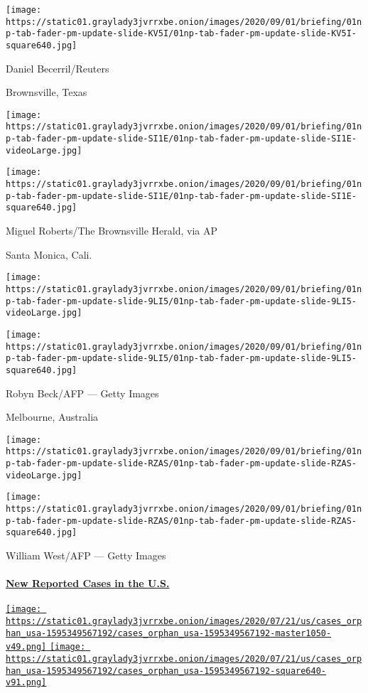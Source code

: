 \texttt{[image: https://static01.graylady3jvrrxbe.onion/images/2020/09/01/briefing/01np-tab-fader-pm-update-slide-KV5I/01np-tab-fader-pm-update-slide-KV5I-square640.jpg]}

 Daniel Becerril/Reuters

Brownsville, Texas

\texttt{[image: https://static01.graylady3jvrrxbe.onion/images/2020/09/01/briefing/01np-tab-fader-pm-update-slide-SI1E/01np-tab-fader-pm-update-slide-SI1E-videoLarge.jpg]}

\texttt{[image: https://static01.graylady3jvrrxbe.onion/images/2020/09/01/briefing/01np-tab-fader-pm-update-slide-SI1E/01np-tab-fader-pm-update-slide-SI1E-square640.jpg]}

 Miguel Roberts/The Brownsville Herald, via AP

Santa Monica, Cali.

\texttt{[image: https://static01.graylady3jvrrxbe.onion/images/2020/09/01/briefing/01np-tab-fader-pm-update-slide-9LI5/01np-tab-fader-pm-update-slide-9LI5-videoLarge.jpg]}

\texttt{[image: https://static01.graylady3jvrrxbe.onion/images/2020/09/01/briefing/01np-tab-fader-pm-update-slide-9LI5/01np-tab-fader-pm-update-slide-9LI5-square640.jpg]}

 Robyn Beck/AFP --- Getty Images

Melbourne, Australia

\texttt{[image: https://static01.graylady3jvrrxbe.onion/images/2020/09/01/briefing/01np-tab-fader-pm-update-slide-RZAS/01np-tab-fader-pm-update-slide-RZAS-videoLarge.jpg]}

\texttt{[image: https://static01.graylady3jvrrxbe.onion/images/2020/09/01/briefing/01np-tab-fader-pm-update-slide-RZAS/01np-tab-fader-pm-update-slide-RZAS-square640.jpg]}

 William West/AFP --- Getty Images

\hypertarget{new-reported-cases-in-the-us}{%
\paragraph{\texorpdfstring{\href{https://www.nytimes3xbfgragh.onion/interactive/2020/us/coronavirus-us-cases.html}{New
Reported Cases in the
U.S.}}{New Reported Cases in the U.S.}}\label{new-reported-cases-in-the-us}}

\href{https://www.nytimes3xbfgragh.onion/interactive/2020/us/coronavirus-us-cases.html}{\texttt{[image: https://static01.graylady3jvrrxbe.onion/images/2020/07/21/us/cases\_orphan\_usa-1595349567192/cases\_orphan\_usa-1595349567192-master1050-v49.png]}
\texttt{[image: https://static01.graylady3jvrrxbe.onion/images/2020/07/21/us/cases\_orphan\_usa-1595349567192/cases\_orphan\_usa-1595349567192-square640-v91.png]}}

